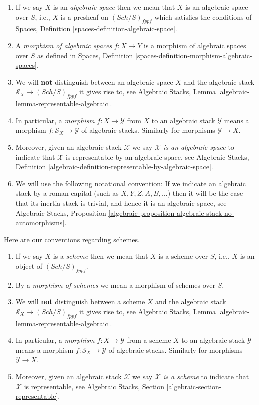 \documentclass{stacks-project}
\theoremstyle{plain}
\theoremstyle{definition}
\theoremstyle{remark}
\numberwithin{equation}{subsection}
\def\Sch{\mathit{Sch}}
\begin{document}
\begin{enumerate}
\item If we say $X$ is an {\it algebraic space} then we mean that
$X$ is an algebraic space over $S$, i.e., $X$ is a presheaf on
$(\Sch/S)_{fppf}$ which satisfies the conditions of
Spaces, Definition \ref{spaces-definition-algebraic-space}.
\item A {\it morphism of algebraic spaces} $f :X \to Y$ is a morphism
of algebraic spaces over $S$ as defined in
Spaces, Definition \ref{spaces-definition-morphism-algebraic-spaces}.
\item We will {\bf not} distinguish between an algebraic space $X$
and the algebraic stack $\mathcal{S}_X \to (\Sch/S)_{fppf}$
it gives rise to, see
Algebraic Stacks, Lemma \ref{algebraic-lemma-representable-algebraic}.
\item In particular, a {\it morphism} $f : X \to \mathcal{Y}$ from $X$
to an algebraic stack $\mathcal{Y}$ means a morphism
$f : \mathcal{S}_X \to \mathcal{Y}$ of algebraic stacks.
Similarly for morphisms $\mathcal{Y} \to X$.
\item Moreover, given an algebraic stack $\mathcal{X}$ we say
{\it $\mathcal{X}$ is an algebraic space} to indicate that $\mathcal{X}$
is representable by an algebraic space, see
Algebraic Stacks,
Definition \ref{algebraic-definition-representable-by-algebraic-space}.
\item We will use the following notational convention: If we
indicate an algebraic stack by a roman capital
(such as $X, Y, Z, A, B, \ldots$) then it will be the case that
its inertia stack is trivial, and hence it is an algebraic space, see
Algebraic Stacks,
Proposition \ref{algebraic-proposition-algebraic-stack-no-automorphisms}.
\end{enumerate}
Here are our conventions regarding schemes.
\begin{enumerate}
\item If we say $X$ is a {\it scheme} then we mean that
$X$ is a scheme over $S$, i.e., $X$ is an object of $(\Sch/S)_{fppf}$.
\item By a {\it morphism of schemes} we mean a morphism of schemes over $S$.
\item We will {\bf not} distinguish between a scheme $X$ and the
algebraic stack $\mathcal{S}_X \to (\Sch/S)_{fppf}$ it gives rise
to, see
Algebraic Stacks, Lemma \ref{algebraic-lemma-representable-algebraic}.
\item In particular, a {\it morphism} $f : X \to \mathcal{Y}$ from
a scheme $X$ to an algebraic stack $\mathcal{Y}$ means a morphism
$f : \mathcal{S}_X \to \mathcal{Y}$ of algebraic stacks.
Similarly for morphisms $\mathcal{Y} \to X$.
\item Moreover, given an algebraic stack $\mathcal{X}$ we say
{\it $\mathcal{X}$ is a scheme} to indicate that $\mathcal{X}$
is representable, see
Algebraic Stacks, Section \ref{algebraic-section-representable}.
\end{enumerate}
\end{document}
